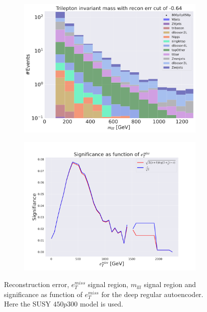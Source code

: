 \begin{figure}[H]
    \hfill
    \begin{subfigure}{.40\textwidth}
        \includegraphics[width=\textwidth]{Figures/AE_testing/big/3lep/b_data_recon_big_rm3_feats_sig_800p0p050p_mlll_recon_errcut_-0.64.pdf}
        \caption{}
        \label{fig:AE_3lep_big_mlll_800_3}
    \end{subfigure}
    \hfill   
    \begin{subfigure}{.40\textwidth}
        \includegraphics[width=\textwidth]{Figures/AE_testing/big/3lep/significance_etmiss_800p0p050p_-0.6363296281507171.pdf}
        \caption{}
        \label{fig:AE_3lep_big_signi_800_3}
    \end{subfigure}
    \hfill      
    \caption[3lep deep network | $800p50$ | AE | 3]{Reconstruction error, $e_T^{miss}$ signal region, $m_{lll}$ signal region and significance as function of 
    $e_T^{miss}$ for the deep regular autoencoder. Here the SUSY $450p300$ model is used.}
    \label{fig:AE_3lep_big_rec_sig_signi_800_3}
\end{figure}

